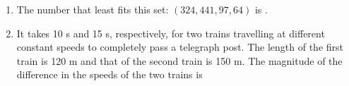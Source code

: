 \documentclass[journal]{IEEEtran}
\begin{document}
\begin{enumerate}
    \begin{enumerate}  \end{enumerate}              
    
    \hfill{}
    
    \item The number that least fits this set: $(324, 441, 97, 64)$ is .
    
    \begin{enumerate}  \end{enumerate}              
    
    \hfill{}
    
    \item It takes 10 s and 15 s, respectively, for two trains travelling at different constant speeds to completely pass a telegraph post. The length of the first train is 120 m and that of the second train is 150 m. The magnitude of the difference in the speeds of the two trains  is 
    
    \begin{enumerate}  \end{enumerate}              
    
    \hfill{}
         




\end{enumerate}
\end{document}
